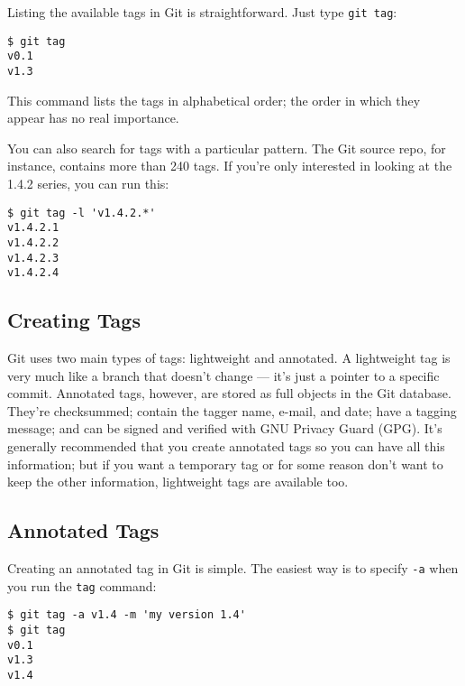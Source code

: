 \documentclass[a4paper]{book}
\newcounter{tab}[chapter]
\begin{document}
Listing the available tags in Git is straightforward. Just type \texttt{git tag}:

\begin{shaded}\begin{verbatim}
$ git tag
v0.1
v1.3
\end{verbatim}\end{shaded}

This command lists the tags in alphabetical order; the order in which they appear has no real importance.

You can also search for tags with a particular pattern. The Git source repo, for instance, contains more than 240 tags. If you're only interested in looking at the 1.4.2 series, you can run this:

\begin{shaded}\begin{verbatim}
$ git tag -l 'v1.4.2.*'
v1.4.2.1
v1.4.2.2
v1.4.2.3
v1.4.2.4
\end{verbatim}\end{shaded}

\subsection{Creating Tags}\label{creating-tags}

Git uses two main types of tags: lightweight and annotated. A lightweight tag is very much like a branch that doesn't change --- it's just a pointer to a specific commit. Annotated tags, however, are stored as full objects in the Git database. They're checksummed; contain the tagger name, e-mail, and date; have a tagging message; and can be signed and verified with GNU Privacy Guard (GPG). It's generally recommended that you create annotated tags so you can have all this information; but if you want a temporary tag or for some reason don't want to keep the other information, lightweight tags are available too.

\subsection{Annotated Tags}\label{annotated-tags}

Creating an annotated tag in Git is simple. The easiest way is to specify \texttt{-a} when you run the \texttt{tag} command:

\begin{shaded}\begin{verbatim}
$ git tag -a v1.4 -m 'my version 1.4'
$ git tag
v0.1
v1.3
v1.4
\end{verbatim}\end{shaded}
\end{document}
